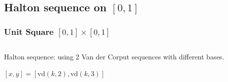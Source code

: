 \documentclass[serif]{beamer} %
\begin{document}
\subsection{Halton sequence on $[0,1]$}
\begin{frame}[fragile]
\frametitle{Unit Square $[0,1] \times [0,1]$}
\begin{columns}
\begin{column}{0.45\textwidth}
Halton sequence: using 2 Van der Corput sequences with different bases.
\begin{example}
    $[x,y] = [\mathrm{vd}(k,2), \mathrm{vd}(k,3)]$
\end{example}
\end{column}
\begin{column}{0.45\textwidth}
\end{column}
\end{columns}
\end{frame}
\end{document}
